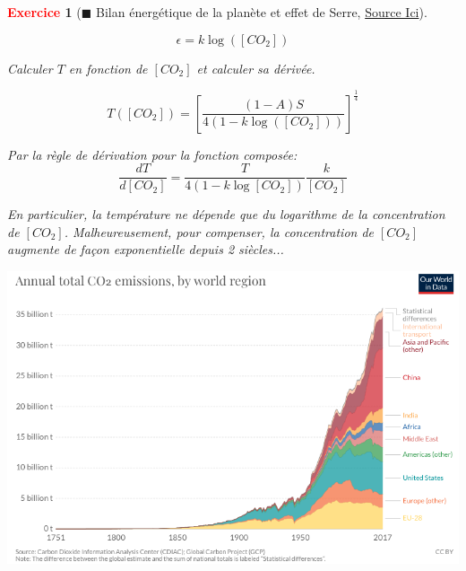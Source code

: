 \documentclass[11pt]{article}
\theoremstyle{mythmstyle}
\newtheorem{exo}{\textcolor{red}{\textbf{Exercice}}}
\begin{document}
\begin{exo}[$\blacksquare$ Bilan énergétique de la planète et effet de Serre, \href{http://step.ipgp.fr/images/e/ec/Bernard_geodynext_td1_corr.pdf}{Source Ici}]
\begin{enumerate}
$$
\epsilon= k\log([CO_2])
$$

Calculer $T$ en fonction de $[CO_2]$ et calculer sa dérivée.

\begin{solution}
$$
T([CO_2])= [\frac{(1-A)S}{4(1-k\log([CO_2]))}]^{\frac{1}{4}}
$$

Par la règle de dérivation pour la fonction composée:
$$
\frac{dT}{d[CO_2]}= \frac{T}{4(1-k\log[CO_2])}\frac{k}{[CO_2]}
$$
\end{solution}


\end{enumerate}

En particulier, la température ne dépende que du logarithme de la concentration de $[CO_2]$. Malheureusement, pour compenser, la concentration de $[CO_2]$ augmente de façon exponentielle depuis 2 siècles...

\begin{center}
    \includegraphics[scale=0.4]{co2increase.png}
\end{center}

\end{exo}

\vspace{3cm}
\end{document}
